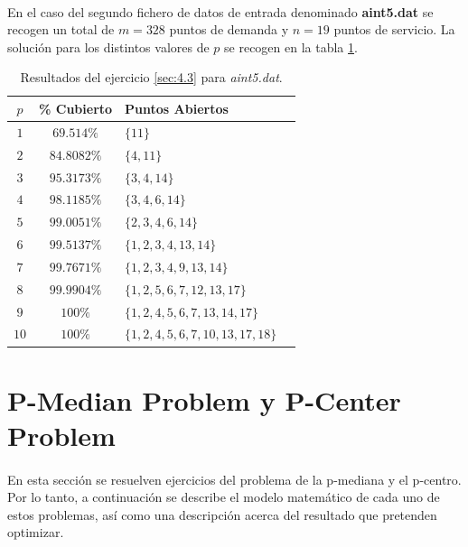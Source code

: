 \documentclass[spanish]{article}
\begin{document}
			\paragraph{}
			En el caso del segundo fichero de datos de entrada denominado \textbf{aint5.dat} se recogen un total de $m = 328$ puntos de demanda y $n=19$ puntos de servicio. La solución para los distintos valores de $p$ se recogen en la tabla \ref{table:sol-4.3b}.

			\begin{table}[h]
				\begin{center}
					\begin{tabular}{|c || c || l || c | }
						\hline
						$p$		&	\% Cubierto	& Puntos Abiertos 						 	\\ \hline \hline
						$1$ 	& $69.514\%$ 	& $\{11\}$ 											\\ \hline
						$2$ 	& $84.8082\%$ & $\{4,11\}$ 										\\ \hline
						$3$ 	& $95.3173\%$ & $\{3,4,14\}$ 									\\ \hline
						$4$ 	& $98.1185\%$ & $\{3,4,6,14\}$ 								\\ \hline
						$5$ 	& $99.0051\%$ & $\{2,3,4,6,14\}$ 							\\ \hline
						$6$ 	& $99.5137\%$ & $\{1,2,3,4,13,14\}$ 					\\ \hline
						$7$ 	& $99.7671\%$ & $\{1,2,3,4,9,13,14\}$ 				\\ \hline
						$8$ 	& $99.9904\%$ & $\{1,2,5,6,7,12,13,17\}$ 			\\ \hline
						$9$ 	& $100\%$ 		& $\{1,2,4,5,6,7,13,14,17\}$		\\ \hline
						$10$ 	& $100\%$ 		& $\{1,2,4,5,6,7,10,13,17,18\}$	\\
						\hline
					\end{tabular}
				\end{center}
				\caption{Resultados del ejercicio \ref{sec:4.3} para \emph{aint5.dat}.}
				\label{table:sol-4.3b}
			\end{table}

	\section{P-Median Problem y P-Center Problem}
	\label{sec:5}

		\paragraph{}
		En esta sección se resuelven ejercicios del problema de la p-mediana y el p-centro. Por lo tanto, a continuación se describe el modelo matemático de cada uno de estos problemas, así como una descripción acerca del resultado que pretenden optimizar.
\end{document}
